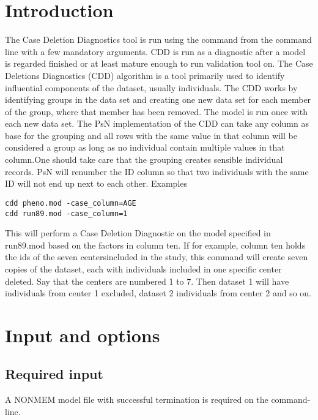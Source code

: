 




\maketitle
\newcommand{\guidetoolname}{cdd}


\section{Introduction}
The Case Deletion Diagnostics tool is run using the command from the command line with a few mandatory arguments. 
CDD is run as a diagnostic after a model is regarded finished or at least mature enough to run validation tool on. 
The Case Deletions Diagnostics (CDD) algorithm is a tool primarily used to identify influential components of the dataset, 
usually individuals. The CDD works by identifying groups in the data set and creating one new data set for each member 
of the group, where that member has been removed. The model is run once with each new data set. The PsN implementation 
of the CDD can take any column as base for the grouping and all rows with the same value in that column will be considered 
a group as long as no individual contain multiple values in that column.One should take care that the grouping creates sensible 
individual records. PsN will renumber the ID column so that two individuals with the same ID will not end up next to each other.
Examples
\begin{verbatim}
cdd pheno.mod -case_column=AGE
cdd run89.mod -case_column=1
\end{verbatim}
This will perform a Case Deletion Diagnostic on the model specified in run89.mod based on the factors in column ten. If for example, 
column ten holds the ids of the seven centersincluded in the study, this command will create seven copies of the dataset, each with 
individuals included in one specific center deleted. Say that the centers are numbered 1 to 7. Then dataset 1 will have individuals from 
center 1 excluded, dataset 2 individuals from center 2 and so on.
\section{Input and options}

\subsection{Required input}
A NONMEM model file with successful termination is required on the command-line.

